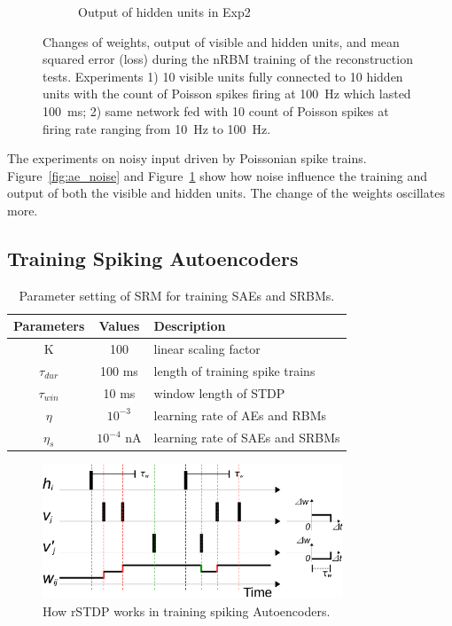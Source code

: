 \begin{figure}
\begin{subfigure}[t]{0.4\textwidth}
		\caption{Output of hidden units in Exp2}
	\end{subfigure}
	\caption{Changes of weights, output of visible and hidden units, and mean squared error (loss) during the nRBM training of the reconstruction tests. 
		Experiments 1) 10 visible units fully connected to 10 hidden units with the count of Poisson spikes firing at 100~Hz which lasted 100~ms; 2) same network fed with 10 count of Poisson spikes at firing rate ranging from 10~Hz to 100~Hz.}
	\label{fig:rbm_noise}
\end{figure}
The experiments on noisy input driven by Poissonian spike trains.
Figure~\ref{fig:ae_noise} and Figure~\ref{fig:rbm_noise} show how noise influence the training and output of both the visible and hidden units.
The change of the weights oscillates more. %

\subsection{Training Spiking Autoencoders}
\label{subsec:SAE}
\begin{table}[hbbp]
	\centering
	\caption{\label{tbl:srm}Parameter setting of SRM for training SAEs and SRBMs.}
	\bgroup
	\def\arraystretch{1.4}
	\begin{tabular}{c c l}
		Parameters & Values & Description \\
		\hline
		K & 100 & linear scaling factor\\
		$\tau_{dur}$ & 100 ms &  length of training spike trains\\
		$\tau_{win}$ & 10 ms & window length of STDP\\
		$\eta$ & $10^{-3}$ & learning rate of AEs and RBMs\\
		$\eta_s$ & $10^{-4}$ nA & learning rate of SAEs and SRBMs\\
	\end{tabular}
	\egroup
\end{table}
\begin{figure}
	\centering
	\includegraphics[width=0.8\textwidth]{pics_sdlm/rSTDP.pdf}
	\caption{How rSTDP works in training spiking Autoencoders.}
	\label{fig:rSTDP}
\end{figure}


